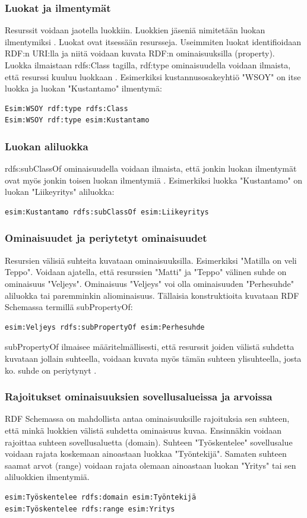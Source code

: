 \documentclass[finnish]{tktltiki2}
\theoremstyle{definition}
\theoremstyle{remark}
\begin{document}
\subsubsection{Luokat ja ilmentymät}
Resurssit voidaan jaotella luokkiin. Luokkien jäseniä nimitetään luokan ilmentymiksi \cite{RDFS}. Luokat ovat itsessään resursseja. Useimmiten luokat identifioidaan RDF:n URI:lla ja niitä voidaan kuvata RDF:n ominaisuuksilla (property). Luokka ilmaistaan rdfs:Class tagilla, rdf:type ominaisuudella voidaan ilmaista, että resurssi kuuluu luokkaan \cite{RDFS}. Esimerkiksi kustannusosakeyhtiö "WSOY" on itse luokka ja  luokan "Kustantamo" ilmentymä:
\begin{verbatim}
Esim:WSOY rdf:type rdfs:Class
Esim:WSOY rdf:type esim:Kustantamo
\end{verbatim}  

\subsubsection{Luokan aliluokka}
rdfs:subClassOf ominaisuudella voidaan ilmaista, että jonkin luokan ilmentymät ovat myös jonkin toisen luokan ilmentymiä \cite{RDFS}. Esimerkiksi 
luokka "Kustantamo" on luokan "Liikeyritys" aliluokka:
\begin{verbatim}
esim:Kustantamo rdfs:subClassOf esim:Liikeyritys 
\end{verbatim}

\subsubsection{Ominaisuudet ja periytetyt ominaisuudet}
Resursien välisiä suhteita kuvataan ominaisuuksilla. Esimerkiksi "Matilla on veli Teppo". Voidaan ajatella, että resurssien "Matti" ja "Teppo" välinen suhde on ominaisuus "Veljeys". Ominaisuus "Veljeys" voi olla ominaisuuden "Perhesuhde"  aliluokka tai paremminkin aliominaisuus. Tällaisia konstruktioita kuvataan RDF Schemassa termillä subPropertyOf: 
\begin{verbatim}
esim:Veljeys rdfs:subPropertyOf esim:Perhesuhde
\end{verbatim}
 subPropertyOf ilmaisee määritelmällisesti, että resurssit joiden välistä suhdetta kuvataan jollain suhteella, voidaan kuvata myös tämän suhteen ylisuhteella, josta ko. suhde on periytynyt \cite{RDFS}. 
\subsubsection{Rajoitukset ominaisuuksien sovellusalueissa ja arvoissa}
RDF Schemassa on mahdollista antaa ominaisuuksille rajoituksia sen suhteen, että minkä luokkien välistä suhdetta ominaisuus kuvaa. Ensinnäkin
voidaan rajoittaa suhteen sovellusaluetta (domain). Suhteen  "Työskentelee" sovellusalue voidaan rajata koskemaan ainoastaan luokkaa "Työntekijä". Samaten suhteen saamat arvot (range) voidaan rajata olemaan ainoastaan luokan "Yritys" tai sen aliluokkien ilmentymiä. 
\begin{verbatim}
esim:Työskentelee rdfs:domain esim:Työntekijä
esim:Työskentelee rdfs:range esim:Yritys
\end{verbatim}
\end{document}
